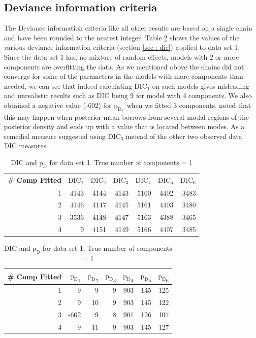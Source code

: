 \subsection{Deviance information criteria}
\label{subsec : dic_simulation_results}
The Deviance information criteria like all other results are based on a single chain and have been rounded to the nearest integer. Table \ref{table : ds_simple_dic} shows the values of the various deviance information criteria (section \ref{sec : dic}) applied to data set 1. Since the data set 1 had no mixture of random effects, models with 2 or more components are overfitting the data. As we mentioned above the chains did not converge for some of the parameters in the models with more components than needed, we can see that indeed calculating $\text{DIC}_1$ on such models gives misleading and unrealistic results such as DIC being 9 for model with 4 components. We also obtained a negative value (-602) for ${\text{p}_\text{D}}_1$ when we fitted 3 components. \citet{celeux_deviance_2006} noted that this may happen when posterior mean borrows from several modal regions of the posterior density and ends up with a value that is located between modes. As a remedial measure \citet{celeux_deviance_2006} suggested using $\text{DIC}_3$ instead of the other two observed data DIC measures.\\

\begin{table}[!htb]
\centering
\captionsetup{justification=centering}
\caption{DIC and $\text{p}_\text{D}$ for data set 1. True number of components = 1}
\label{table : ds_simple_dic} 
\begin{tabular}{@{}rrrrrrr@{}}
\toprule
\# Comp Fitted & $\text{DIC}_1$ & $\text{DIC}_2$  & $\text{DIC}_3$  & $\text{DIC}_4$  & $\text{DIC}_5$  & $\text{DIC}_6$  \\ \midrule
1      & 4143 & 4144 & 4143 & 5160 & 4402 & 3483 \\
2      & 4146 & 4147 & 4145 & 5161 & 4403 & 3480 \\
3      & 3536 & 4148 & 4147 & 5163 & 4388 & 3465 \\
4      & 9    & 4151 & 4149 & 5166 & 4407 & 3485 \\ \bottomrule
\end{tabular}

\begin{tabular}{@{}rrrrrrr@{}}
\toprule
\# Comp Fitted & ${\text{p}_\text{D}}_1$ & ${\text{p}_\text{D}}_2$ & ${\text{p}_\text{D}}_3$ & ${\text{p}_\text{D}}_4$ & ${\text{p}_\text{D}}_5$ & ${\text{p}_\text{D}}_6$ \\ \midrule
1      & 9    & 9    & 9    & 903  & 145  & 125  \\
2      & 9    & 10   & 9    & 903  & 145  & 122  \\
3      & -602 & 9    & 8    & 901  & 126  & 107  \\
4      & 9    & 11   & 9    & 903  & 145  & 127  \\ \bottomrule
\end{tabular}
\end{table}

